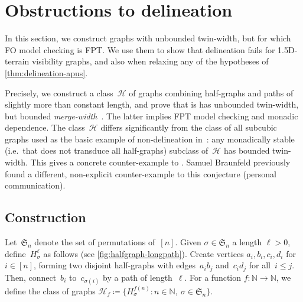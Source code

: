 \documentclass[a4paper,UKenglish,cleveref,thm-restate]{lipics-v2021}
\theoremstyle{remark}
\newcommand{\eqdef}{\coloneqq}
\newcommand{\Hc}{\mathcal{H}}
\newcommand{\N}{\mathbb{N}}
\newcommand{\Perm}{\mathfrak{S}}
\begin{document}
\section{Obstructions to delineation}\label{sec:obstructions}
In this section, we construct graphs with unbounded twin-width, but for which FO model checking is FPT.
We use them to show that delineation fails for 1.5D-terrain visibility graphs,
and also when relaxing any of the hypotheses of \cref{thm:delineation-apus}.

Precisely, we construct a class~$\Hc$ of graphs combining half-graphs and paths of slightly more than constant length,
and prove that is has unbounded twin-width, but bounded \emph{merge-width}~\cite{merge-width}.
The latter implies FPT model checking and monadic dependence.
The class~$\Hc$ differs significantly from the class of all subcubic graphs used as the basic example of non-delineation in~\cite{bonnet2022delineation}:
any monadically stable (i.e.\ that does not transduce all half-graphs) subclass of~$\Hc$ has bounded twin-width.
This gives a concrete counter-example to \cite[Conjecture~6.6]{bonnet2022delineation}.
Samuel Braunfeld previously found a different, non-explicit counter-example to this conjecture (personal communication).

\subsection{Construction}
Let~$\Perm_n$ denote the set of permutations of~$[n]$.
Given $\sigma \in \Perm_n$ a length $\ell > 0$, define~$H_\sigma^\ell$ as follows (see \cref{fig:halfgraph-longpath}).
Create vertices $a_i,b_i,c_i,d_i$ for~$i \in [n]$, forming two disjoint half-graphs with edges~$a_ib_j$ and~$c_id_j$ for all~$i \le j$.
Then, connect~$b_i$ to~$c_{\sigma(i)}$ by a path of length~$\ell$.
For a function $f : \N \to \N$, we define the class of graphs $\Hc_f \eqdef \{H_\sigma^{f(n)} : n \in \N,\ \sigma \in \Perm_n\}$.
\end{document}
